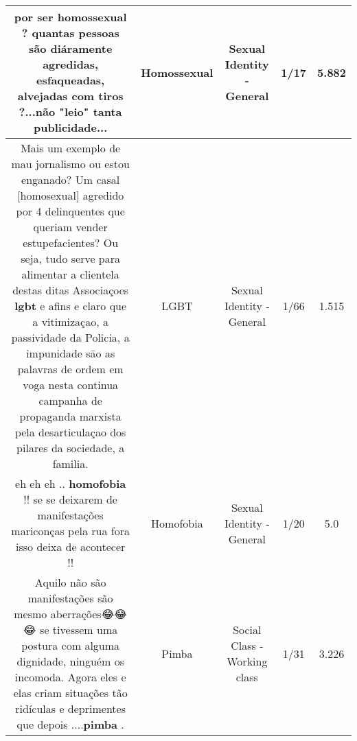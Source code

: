 \documentclass[11pt]{article}
\newlength\mylength
\begin{document}
\begin{center}
\begin{longtable}{|C{.65\mylength}|C{.30\mylength}|C{.12\mylength}|C{.12\mylength}|C{.12\mylength}|}
  \small por ser \textbf{homossexual} ? quantas pessoas são diáramente agredidas, esfaqueadas, alvejadas com tiros ?...não "leio" tanta publicidade...\normalsize   & Homossexual & Sexual Identity - General & 1/17 & 5.882 \\  \hline
  \small Mais um exemplo de mau jornalismo ou estou enganado? Um casal [homosexual] agredido por 4 delinquentes que queriam vender estupefacientes? Ou seja, tudo serve para alimentar a clientela destas ditas Associaçoes \textbf{lgbt} e afins e claro que a vitimizaçao, a passividade da Policia, a impunidade sāo as palavras de ordem em voga nesta continua campanha de propaganda marxista pela desarticulaçao dos pilares da sociedade, a familia.\normalsize   & LGBT & Sexual Identity - General & 1/66 & 1.515 \\  \hline
  \small eh eh eh .. \textbf{homofobia} !! se se deixarem de manifestações mariconças pela rua fora isso deixa de acontecer !!\normalsize   & Homofobia & Sexual Identity - General & 1/20 & 5.0 \\  \hline
  \small Aquilo não são manifestações são mesmo aberrações😂😂😂  se tivessem uma postura  com alguma dignidade,  ninguém os incomoda. Agora eles e elas criam situações tão ridículas e deprimentes que depois ....\textbf{pimba} .\normalsize   & Pimba & Social Class - Working class & 1/31 & 3.226 \\  \hline
  
\end{longtable}
\end{center}
\end{document}
